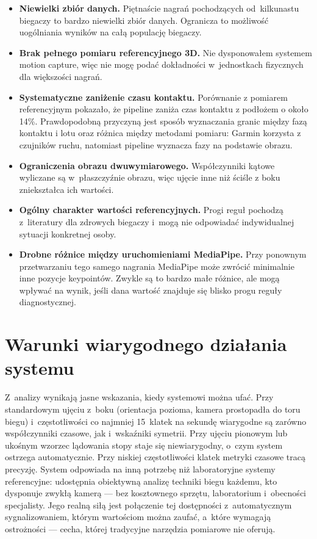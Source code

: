 \begin{itemize}
    \item \textbf{Niewielki zbiór danych.} Piętnaście nagrań pochodzących od~kilkunastu biegaczy to bardzo niewielki zbiór danych. Ogranicza to możliwość uogólniania wyników na całą populację biegaczy.
    \item \textbf{Brak pełnego pomiaru referencyjnego 3D.} Nie dysponowałem systemem motion capture, więc nie mogę podać dokładności w~jednostkach fizycznych dla większości nagrań. 
\item \textbf{Systematyczne zaniżenie czasu kontaktu.} Porównanie z pomiarem referencyjnym pokazało, że pipeline zaniża czas kontaktu z podłożem o około 14\%. Prawdopodobną przyczyną jest sposób wyznaczania granic między fazą kontaktu i lotu oraz różnica między metodami pomiaru: Garmin korzysta z czujników ruchu, natomiast pipeline wyznacza fazy na podstawie obrazu.
\\
    \item \textbf{Ograniczenia obrazu dwuwymiarowego.} Współczynniki kątowe wyliczane są w~płaszczyźnie obrazu, więc ujęcie inne niż ściśle z boku zniekształca ich wartości.
    \item \textbf{Ogólny charakter wartości referencyjnych.} Progi reguł pochodzą z~literatury dla zdrowych biegaczy i~mogą nie odpowiadać indywidualnej sytuacji konkretnej osoby.
\item \textbf{Drobne różnice między uruchomieniami MediaPipe.} Przy ponownym przetwarzaniu tego samego nagrania MediaPipe może zwrócić minimalnie inne pozycje keypointów. Zwykle są to bardzo małe różnice, ale mogą wpływać na wynik, jeśli dana wartość znajduje się blisko progu reguły diagnostycznej.

\end{itemize}

\section{Warunki wiarygodnego działania systemu}
\label{sec:implikacje}

Z~analizy wynikają jasne wskazania, kiedy systemowi można ufać. Przy standardowym ujęciu z~boku (orientacja pozioma, kamera prostopadła do toru biegu) i~częstotliwości co najmniej 15~klatek na sekundę wiarygodne są zarówno współczynniki czasowe, jak i~wskaźniki symetrii. Przy ujęciu pionowym lub ukośnym wzorzec lądowania stopy staje się niewiarygodny, o~czym system ostrzega automatycznie. Przy niskiej częstotliwości klatek metryki czasowe tracą precyzję. System odpowiada na inną potrzebę niż laboratoryjne systemy referencyjne: udostępnia obiektywną analizę techniki biegu każdemu, kto dysponuje zwykłą kamerą --- bez kosztownego sprzętu, laboratorium i~obecności specjalisty. Jego realną siłą jest połączenie tej dostępności z~automatycznym sygnalizowaniem, którym wartościom można zaufać, a~które wymagają ostrożności --- cecha, której tradycyjne narzędzia pomiarowe nie oferują.

